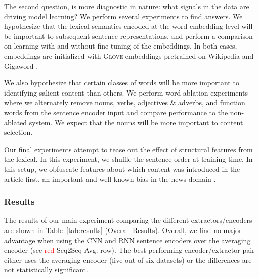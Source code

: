  The second question, is more diagnostic in nature: what signals
 in the data are driving model learning?
 We perform several experiments to find answers. 
 We hypothesize that the lexical semantics encoded at the word embedding
 level will be important to subsequent sentence representations, and
 perform a comparison on learning with and without fine tuning of the 
 embeddings. In both cases, embeddings are initialized with \textsc{Glove}
 embeddings pretrained on Wikipedia and Gigaword \citep{pennington2014glove}.
 
 
 We also hypothesize that certain classes of words will be more important 
 to identifying salient content than others. We perform word ablation 
 experiments where we alternately remove nouns, verbs, adjectives \& adverbs,
 and function words from the sentence encoder input and compare performance 
 to the non-ablated system. We expect that the nouns will be more important
 to content selection. 


 Our final experiments attempt to tease out the effect of structural features 
 from the lexical. In this experiment, we shuffle the sentence order at 
 training time. In this setup, we obfuscate features about which content 
 was introduced in the article first, an important and well known bias in the
 news domain \citep{nenkova2005automatic}. 

 

 \subsubsection{Results}

 
  

The results of our main experiment comparing 
the different extractors/encoders are shown in 
Table~\ref{tab:results} (Overall Results).
Overall, we find no major advantage when using the CNN and RNN sentence
encoders over the averaging encoder (see \textcolor{red}{red} Seq2Seq Avg. row). The best performing encoder/extractor pair either 
uses the averaging 
encoder (five out of six datasets) or the differences 
are not statistically significant. %

